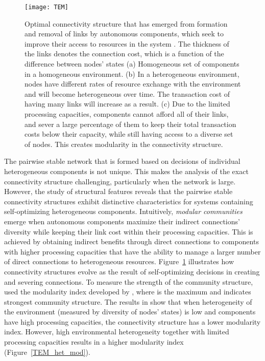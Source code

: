 \documentclass[journal,onecolumn]{IEEEtran}
\theoremstyle{plain}
\begin{document}
\begin{figure}[!t]
\centering
\texttt{[image: TEM]}
\caption{Optimal connectivity structure that has emerged from formation and removal of links by autonomous components, which seek to improve their access to resources in the system \citep{heydari2015emergence}. The thickness of the links denotes the connection cost, which is a function of the difference between nodes' states (a) Homogeneous set of components in a homogeneous environment. (b) In a heterogeneous environment, nodes have different rates of resource exchange with the environment and will become heterogeneous over time. The transaction cost of having many links will increase as a result. (c) Due to the limited processing capacities, components cannot afford all of their links, and sever a large percentage of them to keep their total transaction costs below their capacity, while still having access to a diverse set of nodes. This creates modularity in the connectivity structure.}
\label{tem}
\end{figure}

The pairwise stable network that is formed based on decisions of individual heterogeneous components is not unique. This makes the analysis of the exact connectivity structure challenging, particularly when the network is large. However, the study of structural features reveals that the pairwise stable connectivity structures exhibit distinctive characteristics for systems containing self-optimizing heterogeneous components.
Intuitively, \textit{modular communities} \citep{newman2006modularity} emerge when autonomous components maximize their indirect connections' diversity while keeping their link cost within their processing capacities. This is achieved by obtaining indirect benefits through direct connections to components with higher processing capacities that have the ability to manage a larger number of direct connections to heterogeneous resources. Figure~\ref{tem} illustrates how connectivity structures evolve as the result of self-optimizing decisions in creating and severing connections. To measure the strength of the community structure, \cite{heydari2015emergence} used the modularity index  developed by \cite{newman2004finding}, where  is the maximum and indicates strongest community structure. The results in \citep{heydari2015emergence} show that when heterogeneity of the environment (measured by diversity of nodes' states) is low and components have high processing capacities, the connectivity structure has a lower modularity index. However, high environmental heterogeneity together with limited processing capacities results in a higher modularity index (Figure~\ref{TEM_het_mod}).
\end{document}
